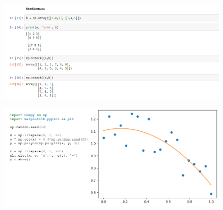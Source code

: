\documentclass[8pt,pdf,hyperref={unicode}, xcolor=dvipsnames, fleqn]{beamer}
\begin{document}
\begin{frame}{}


\begin{figure}
	\includegraphics[width=1.0\textwidth]{Images/main3.png}
\end{figure}

\end{frame}
\begin{frame}{}
\begin{figure}
	\includegraphics[width=1.0\textwidth]{Images/main4.png}
\end{figure}

\end{frame}
\end{document}
